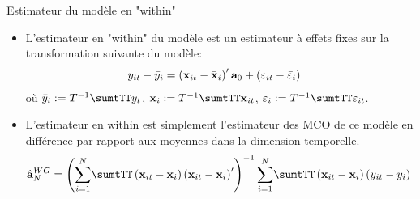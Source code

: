 \begin{frame}[allowframebreaks]{Estimateur du modèle en "within"}
\begin{itemize}
    \item L'estimateur en "within" du modèle est un estimateur à effets fixes sur la transformation suivante du modèle:
    \begin{align*}
        y_{it} - \bar{y}_i &= \left({\mathbf x}_{it} - \bar{{\mathbf x}}_i\right)^\prime{\mathbf a}_0 + (\varepsilon_{it}-\bar{\varepsilon}_i)
        \end{align*}
        où $\bar{y}_i := T^{-1}\sumtTT y_{t}$, $\bar{\boldx}_i := T^{-1}\sumtTT \boldx_{it}$, $\bar{\varepsilon}_i := T^{-1}\sumtTT \varepsilon_{it}$.
        \item L'estimateur en within est simplement l'estimateur des MCO de ce modèle 
        en différence par rapport aux moyennes dans la dimension temporelle.
        \begin{align*}
        \hat{\bolda}^{WG}_N&=\left(\sumiN\sumtTT \left(\boldx_{it} - \bar{\boldx}_i\right) \left(\boldx_{it} - \bar{\boldx}_i\right)^\prime\right)^{-1}
        \sumiN\sumtTT \left(\boldx_{it} - \bar{\boldx}_i\right)\left(y_{it} - \bar{y}_i\right)
        \end{align*}
\end{itemize}
\end{frame}

